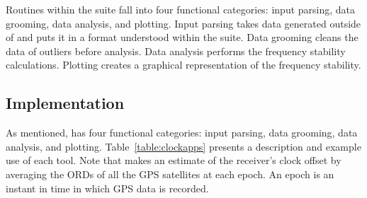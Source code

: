 Routines within the  suite fall into four functional categories: input parsing, data grooming, data analysis, and plotting.  Input parsing takes data generated outside of  and puts it in a format understood within the suite.  Data grooming cleans the data of outliers before analysis.  Data analysis performs the frequency stability calculations.  Plotting creates a graphical representation of the frequency stability.

\subsection*{Implementation}

As mentioned,  has four functional categories: input
parsing, data grooming, data analysis, and plotting.
Table~\ref{table:clockapps} presents a description and example use of
each tool.  Note that  makes an estimate of the receiver’s
clock offset by averaging the ORDs of all the GPS satellites at each
epoch.  An epoch is an instant in time in which GPS data is recorded.
%
